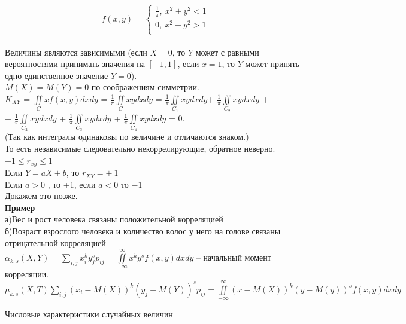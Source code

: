 \documentclass[russian, 12pt, fleqn]{article}
\begin{document}
\begin{equation*} 
f(x, y)=
 \begin{cases}
   \frac{1}{\pi},\    x^2 + y^2 < 1\\
   0 ,\  x^2 + y^2 > 1\\
 \end{cases}
\end{equation*}\\
Величины являются зависимыми (если $X  = 0$, то $Y$ может с равными вероятностями принимать значения на $[-1, 1]$, если $x=1$, то $Y$ может принять одно единственное значение $Y=0$).\\
$M(X)=M(Y) = 0$ по соображениям симметрии.\\
$K_{XY}$ = $\displaystyle{\iint\limits_{C}^{}} xf(x, y)dxdy$ =  $\frac{1}{\pi} \displaystyle{\iint\limits_{C}^{}} xy dxdy$ = $\frac{1}{\pi} \displaystyle{\iint\limits_{C_1}^{}} xy dxdy$+ $\frac{1}{\pi} \displaystyle{\iint\limits_{C_2}^{}} xy dxdy$ +\\+ $\frac{1}{\pi} \displaystyle{\iint\limits_{C_2}^{}} xy dxdy$ + $\frac{1}{\pi} \displaystyle{\iint\limits_{C_3}^{}} xy dxdy$ + $\frac{1}{\pi} \displaystyle{\iint\limits_{C_4}^{}} xy dxdy$ = $0$.\\
(Так как интегралы одинаковы по величине и отличаются знаком.)\\	
То есть независимые следовательно некоррелирующие, обратное неверно.\\
$-1\leq r_{xy} \leq 1$\\
Если $Y=aX+b$, то $r_{XY} = \pm \ 1$\\
Если $a>0$   , то +1, если $a<0$ то $-1$\\
Докажем это позже.\\
\textbf{Пример}\\
а)Вес и рост человека связаны положительной корреляцией\\
б)Возраст взрослого человека и количество волос у него на голове связаны отрицательной корреляцией\\
$\alpha_{k,s} (X,Y) = \sum\limits_{i, j} x_i^k y_j^s p_{ij} =  \displaystyle{\iint\limits_{-\infty}^{\infty}} x^k y^s f(x, y) dx dy  $ -- начальный момент корреляции.\\ 
$\mu_{k,s}(X, T)  \sum\limits_{i, j} (x_i - M(X))^k (y_j - M(Y))^s p_{i j} = \displaystyle{\iint\limits_{-\infty}^{\infty}}(x-M(X))^k(y-M(y))^s f(x, y) dxdy$
\begin{center}
$\textbf{Числовые характеристики случайных величин}$
\end{center}
\end{document}
